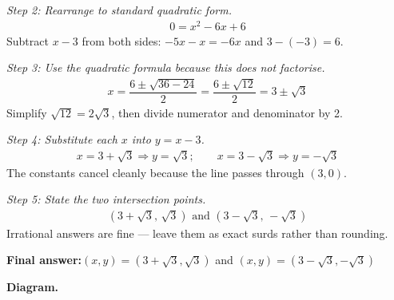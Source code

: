 \documentclass[11pt]{article}
\begin{document}
\textit{Step 2: Rearrange to standard quadratic form.}
\[\begin{gathered}
0 = x^2 - 6x + 6
\end{gathered}\]
Subtract \( x - 3 \) from both sides: \( -5x - x = -6x \) and \( 3 - (-3) = 6 \).

\textit{Step 3: Use the quadratic formula because this does not factorise.}
\[\begin{gathered}
x = \dfrac{6 \pm \sqrt{36 - 24}}{2} = \dfrac{6 \pm \sqrt{12}}{2} = 3 \pm \sqrt{3}
\end{gathered}\]
Simplify \( \sqrt{12} = 2\sqrt{3} \), then divide numerator and denominator by 2.

\textit{Step 4: Substitute each \( x \) into \( y = x - 3 \).}
\[\begin{gathered}
x = 3 + \sqrt{3} \Rightarrow y = \sqrt{3}; \qquad x = 3 - \sqrt{3} \Rightarrow y = -\sqrt{3}
\end{gathered}\]
The constants cancel cleanly because the line passes through \( (3, 0) \).

\textit{Step 5: State the two intersection points.}
\[\begin{gathered}
(3 + \sqrt{3},\, \sqrt{3}) \text{ and } (3 - \sqrt{3},\, -\sqrt{3})
\end{gathered}\]
Irrational answers are fine --- leave them as exact surds rather than rounding.

\begin{answerbox}
\textbf{Final answer:}\quad \(\displaystyle (x, y) = (3 + \sqrt{3}, \sqrt{3})\) and \(\displaystyle (x, y) = (3 - \sqrt{3}, -\sqrt{3})\)
\end{answerbox}
\textbf{Diagram.}
\end{document}
